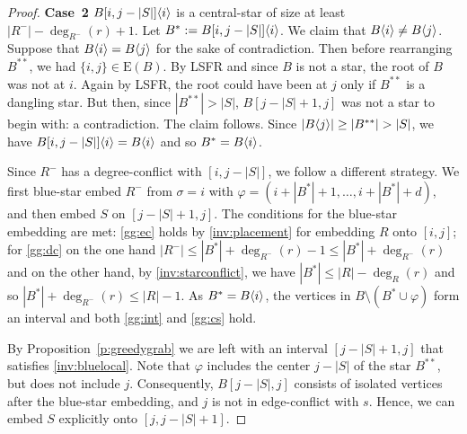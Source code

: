 \documentclass[11pt,a4paper,colorlinks=true,urlcolor=blue,citecolor=red]{article}
\theoremstyle{plain}
\newcommand{\case}[1]{\par\vspace{.5\baselineskip}\noindent\textbf{\sffamily Case~#1}}
\newcommand{\EB}{\mathrm{E}(B)}
\begin{document}
\begin{proof}
\case{2} $B{[i,j-|S|]}\langle{i}\rangle$ is a central-star of size at least
$|R^-|-\deg_{R^-}(r)+1$. Let $B^*:=B{[i,j-|S|]}\langle{i}\rangle$. We claim
that $B\langle{i}\rangle\neq B\langle{j}\rangle$. Suppose that $B\langle{i}\rangle=B\langle{j}\rangle$
for the sake of contradiction. Then before rearranging $B^{**}$, we had
$\{i,j\}\in\EB$. By LSFR and since $B$ is not a star, the root of $B$
was not at $i$. Again by LSFR, the root could have been at $j$ only if
$B^{**}$ is a dangling star. But then, since $|B^{**}|>|S|$,
$B[j-|S|+1,j]$ was not a star to begin with: a contradiction. The claim
follows. Since $|\treeat{j}|\geq|B^{**}|>|S|$, we have
$B{[i,j-|S|]}\langle{i}\rangle=B\langle{i}\rangle$ and so $B^*=B\langle{i}\rangle$.

Since $R^-$ has a degree-conflict with $[i,j-|S|]$, we follow a
different strategy. We first blue-star embed $R^-$ from $\sigma=i$ with
$\varphi=(i+|B^*|+1,\ldots,i+|B^*|+d)$, and then embed $S$ on
$[j-|S|+1,j]$. The conditions for the blue-star embedding are met:
\ref{gg:ec} holds by \ref{inv:placement} for embedding $R$ onto $[i,j]$;
for \ref{gg:dc} on the one hand
$|R^-|\leq |B^*|+\deg_{R^-}(r)-1\leq |B^*|+\deg_{R^-}(r)$ and on the
other hand, by \ref{inv:starconflict}, we have $|B^*|\leq |R|-\deg_R(r)$
and so $|B^*|+\deg_{R^-}(r)\le |R|-1$. As $B^*=B\langle{i}\rangle$, the vertices
in $B\setminus(B^*\cup\varphi)$ form an interval and both \ref{gg:int}
and \ref{gg:cs} hold.

By Proposition~\ref{p:greedygrab} we are left with an interval
$[j-|S|+1,j]$ that satisfies \ref{inv:bluelocal}. Note that $\varphi$
includes the center $j-|S|$ of the star $B^{**}$, but does not include
$j$. Consequently, $B[j-|S|,j]$ consists of isolated vertices after the
blue-star embedding, and $j$ is not in edge-conflict with $s$. Hence, we
can embed $S$ explicitly onto $[j,j-|S|+1]$.
\end{proof}
\end{document}
